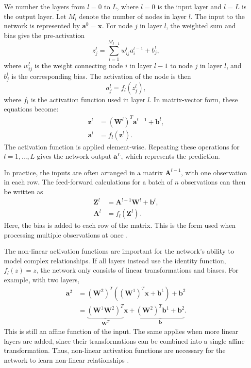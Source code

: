 \documentclass[amssymb,secnumarabic,twocolumn,aps]{revtex4}
\begin{document}
We number the layers from $l=0$ to $L$, where $l=0$ is the input layer and $l=L$ is the output layer. Let $M_l$ denote the number of nodes in layer $l$. The input to the network is represented by $\boldsymbol{a}^0=\boldsymbol{x}$. For node $j$ in layer $l$, the weighted sum and bias give the pre-activation
\begin{equation*}
    z_j^l =
    \sum_{i=1}^{M_{l-1}}w_{ij}^l a_i^{l-1}
    +b_j^l,
\end{equation*}
where $w_{ij}^l$ is the weight connecting node $i$ in layer $l-1$ to node $j$ in layer $l$, and $b_j^l$ is the corresponding bias. The activation of the node is then
\begin{equation*}
    a_j^l = f_l(z_j^l),
\end{equation*}
where $f_l$ is the activation function used in layer $l$. In matrix-vector form, these equations become:
\begin{align*}
    \boldsymbol{z}^l
     & = (\boldsymbol{W}^l)^T
    \boldsymbol{a}^{l-1}+\boldsymbol{b}^l, \\
    \boldsymbol{a}^l
     & = f_l(\boldsymbol{z}^l).
\end{align*}
The activation function is applied element-wise. Repeating these operations for $l=1,\ldots,L$ gives the network output $\boldsymbol{a}^L$, which represents the prediction.

In practice, the inputs are often arranged in a matrix $\boldsymbol{A}^{l-1}$, with one observation in each row. The feed-forward calculations for a batch of $n$ observations can then be written as
\begin{align*}
    \boldsymbol{Z}^l
     & = \boldsymbol{A}^{l-1}\boldsymbol{W}^l
    +\boldsymbol{b}^l,                        \\
    \boldsymbol{A}^l
     & = f_l(\boldsymbol{Z}^l).
\end{align*}
Here, the bias is added to each row of the matrix. This is the form used when processing multiple observations at once \cite{lecturebook}.

The non-linear activation functions are important for the network's ability to model complex relationships. If all layers instead use the identity function, $f_l(z)=z$, the network only consists of linear transformations and biases. For example, with two layers,
\begin{align*}
    \boldsymbol{a}^2
     & = (\boldsymbol{W}^2)^T
    \left((\boldsymbol{W}^1)^T\boldsymbol{x}
    +\boldsymbol{b}^1\right)+\boldsymbol{b}^2                                                \\
     & = \underbrace{(\boldsymbol{W}^1\boldsymbol{W}^2)^T}_{\boldsymbol{W}^T} \boldsymbol{x}
    + \underbrace{(\boldsymbol{W}^2)^T\boldsymbol{b}^1
        +\boldsymbol{b}^2}_{\boldsymbol{b}}.
\end{align*}
This is still an affine function of the input. The same applies when more linear layers are added, since their transformations can be combined into a single affine transformation. Thus, non-linear activation functions are necessary for the network to learn non-linear relationships \cite{lecturebook}.
\end{document}
